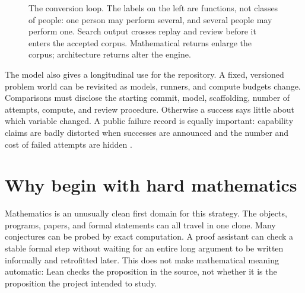\documentclass[10pt]{article}
\begin{document}
\begin{figure}[H]
\caption{The conversion loop.  The labels on the left are functions, not
classes of people: one person may perform several, and several people may
perform one.  Search output crosses replay and review before it enters the
accepted corpus.  Mathematical returns enlarge the corpus; architecture
returns alter the engine.}
\label{fig:conversion}
\end{figure}

The model also gives a longitudinal use for the repository.  A fixed,
versioned problem world can be revisited as models, runners, and compute
budgets change.  Comparisons must disclose the starting commit, model,
scaffolding, number of attempts, compute, and review procedure.  Otherwise a
success says little about which variable changed.  A public failure record is
equally important: capability claims are badly distorted when successes are
announced and the number and cost of failed attempts are hidden
\cite{tao2026}.

\section{Why begin with hard mathematics}\label{sec:math}

Mathematics is an unusually clean first domain for this strategy.  The
objects, programs, papers, and formal statements can all travel in one clone.
Many conjectures can be probed by exact computation.  A proof assistant can
check a stable formal step without waiting for an entire long argument to be
written informally and retrofitted later.  This does not make mathematical
meaning automatic: Lean checks the proposition in the source, not whether it
is the proposition the project intended to study.
\end{document}

